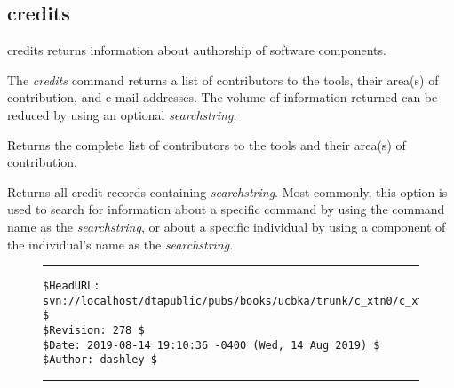 \subsection{credits}

\begin{tclcommandname}{credits}%
returns information about authorship of software components.
\end{tclcommandname}

\begin{tclcommandsynopsis}
\end{tclcommandsynopsis}

\begin{tclcommanddescription}
The \emph{credits} command returns a list of contributors to the tools,
their area(s) of contribution, and e-mail addresses.  The volume of
information returned can be reduced by using an optional \emph{searchstring}.

\begin{tclcommandinternaldescription}
Returns the complete list of contributors to the tools and their area(s) of contribution.
\end{tclcommandinternaldescription}

\begin{tclcommandinternaldescription}
Returns all credit records containing \emph{searchstring}.
Most commonly, this option is used to search for information about a specific
command by using the command name as the \emph{searchstring}, or about a
specific individual by using a component of the individual's name as the
\emph{searchstring}.

\end{tclcommandinternaldescription}

\end{tclcommanddescription}

\noindent\begin{figure}[!b]
\noindent\rule[-0.25in]{\textwidth}{1pt}
\begin{tiny}
\begin{verbatim}
$HeadURL: svn://localhost/dtapublic/pubs/books/ucbka/trunk/c_xtn0/c_xtn0.tex $
$Revision: 278 $
$Date: 2019-08-14 19:10:36 -0400 (Wed, 14 Aug 2019) $
$Author: dashley $
\end{verbatim}
\end{tiny}
\noindent\rule[0.25in]{\textwidth}{1pt}
\end{figure}
%
